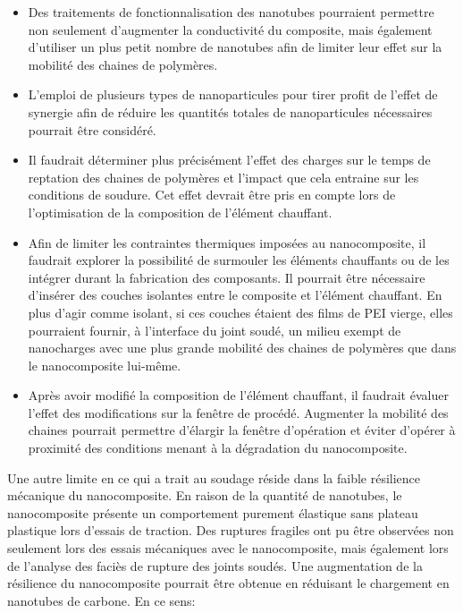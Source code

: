 \begin{itemize}
	\item Des traitements de fonctionnalisation des nanotubes pourraient permettre non seulement d'augmenter la conductivité du composite, mais également d'utiliser un plus petit nombre de nanotubes afin de limiter leur effet sur la mobilité des chaines de polymères. 
	\item L'emploi de plusieurs types de nanoparticules pour tirer profit de l'effet de synergie afin de réduire les quantités totales de nanoparticules nécessaires pourrait être considéré. 
	\item Il faudrait déterminer plus précisément l'effet des charges sur le temps de reptation des chaines de polymères et l'impact que cela entraine sur les conditions de soudure. 
	Cet effet devrait être pris en compte lors de l'optimisation de la composition de l'élément chauffant. 
	\item Afin de limiter les contraintes thermiques imposées au nanocomposite, il faudrait explorer la possibilité de surmouler les éléments chauffants ou de les intégrer durant la fabrication des composants. 
	Il pourrait être nécessaire d'insérer des couches isolantes entre le composite et l'élément chauffant. 
	En plus d'agir comme isolant, si ces couches étaient des films de PEI vierge, elles pourraient fournir, à l'interface du joint soudé, un milieu exempt de nanocharges avec une plus grande mobilité des chaines de polymères que dans le nanocomposite lui-même. 
	\item Après avoir modifié la composition de l'élément chauffant, il faudrait évaluer l'effet  des modifications sur la fenêtre de procédé. 
	Augmenter la mobilité des chaines pourrait permettre d'élargir la fenêtre d'opération et éviter d'opérer à proximité des conditions menant à la dégradation du nanocomposite. 
\end{itemize}

Une autre limite en ce qui a trait au soudage réside dans la faible résilience mécanique du nanocomposite. 
En raison de la quantité de nanotubes, le nanocomposite présente un comportement purement élastique sans plateau plastique lors d'essais de traction. 
Des ruptures fragiles ont pu être observées non seulement lors des essais mécaniques avec le nanocomposite, mais également lors de l'analyse des faciès de rupture des joints soudés. 
Une augmentation de la résilience du nanocomposite pourrait être obtenue en réduisant le chargement en nanotubes de carbone. 
En ce sens: 

